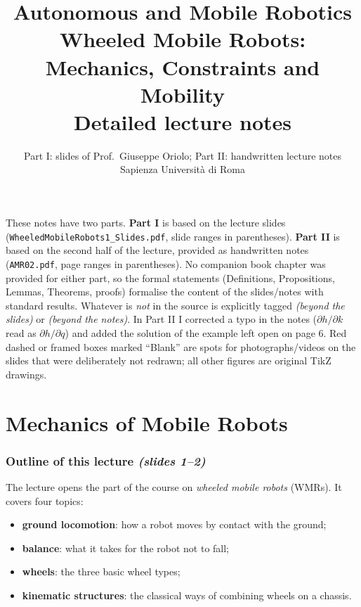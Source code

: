 \documentclass[11pt,a4paper]{article}
\title{\textbf{Autonomous and Mobile Robotics}\\[4pt]
  \Large Wheeled Mobile Robots:\\ Mechanics, Constraints and Mobility\\[4pt]
  \large Detailed lecture notes}
\author{Part I: slides of Prof.\ Giuseppe Oriolo; Part II: handwritten lecture notes\\ Sapienza Universit\`a di Roma}
\date{}
\theoremstyle{definition}
\theoremstyle{plain}
\begin{document}
\maketitle
\tableofcontents
 
\bigskip
\begin{tcolorbox}[colback=gray!5, colframe=black!40, boxrule=0.4pt, title={About these notes}, fonttitle=\bfseries, coltitle=black, colbacktitle=gray!15]
\small
These notes have two parts. \textbf{Part I} is based on the lecture slides (\texttt{WheeledMobileRobots1\_Slides.pdf}, slide ranges in parentheses). \textbf{Part II} is based on the second half of the lecture, provided as handwritten notes (\texttt{AMR02.pdf}, page ranges in parentheses). No companion book chapter was provided for either part, so the formal statements (Definitions, Propositions, Lemmas, Theorems, proofs) formalise the content of the slides/notes with standard results. Whatever is \emph{not} in the source is explicitly tagged \emph{(beyond the slides)} or \emph{(beyond the notes)}. In Part II I corrected a typo in the notes ($\partial h/\partial k$ read as $\partial h/\partial q$) and added the solution of the example left open on page 6. Red dashed or framed boxes marked ``Blank'' are spots for photographs/videos on the slides that were deliberately not redrawn; all other figures are original TikZ drawings.
\end{tcolorbox}
 
\part{Mechanics of Mobile Robots}
 
\section{Outline of this lecture \emph{(slides 1--2)}}
 
The lecture opens the part of the course on \emph{wheeled mobile robots} (WMRs). It covers four topics:
\begin{itemize}[nosep]
  \item \textbf{ground locomotion}: how a robot moves by contact with the ground;
  \item \textbf{balance}: what it takes for the robot not to fall;
  \item \textbf{wheels}: the three basic wheel types;
  \item \textbf{kinematic structures}: the classical ways of combining wheels on a chassis.
\end{itemize}
 
\end{document}
